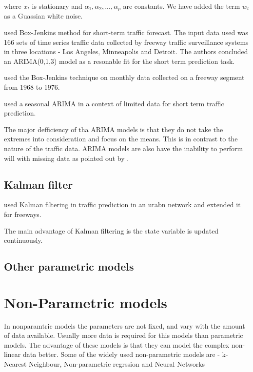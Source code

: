 where $x_{t}$ is stationary and $ \alpha_{1}, \alpha_{2},..., \alpha_{p} $ are constants. We have
added the term $w_{t}$ as a Guassian white noise.


\citet{ahmed1979analysis} used Box-Jenkins method for short-term traffic forecast. The input data
used was 166 sets of time series traffic data collected by freeway traffic surveillance systems in
three locations - Los Angeles, Minneapolis and Detroit. The authors concluded an ARIMA(0,1,3) model
as a resonable fit for the short term prediction task.

\citet{nihan1980use} used the Box-Jenkins technique on monthly data collected on a freeway segment
from 1968 to 1976.

\citet{kumar2015short} used a seasonal ARIMA in a context of limited data for short term traffic 
prediction.

The major defficiency of tha ARIMA models is that they do not take the extremes into
consideration and focus on the means. This is in contrast to the nature of the traffic data.
ARIMA models are also have the inability to perform will with missing data as pointed out by
\citet{smith1997traffic}.

\subsection{Kalman filter}
\citet{okutani1984dynamic} used Kalman filtering in traffic prediction in an urabn network and
extended it for freeways.

The main advantage of Kalman filtering is the state variable is updated continuously.

\subsection{Other parametric models}

\section{Non-Parametric models}
In nonparamtric models the parameters are not fixed, and vary with the amount of data available.
Usually more data is required for this models than parametric models. The advantage of these models
is that they can model the complex non-linear data better. Some of the widely used non-parametric
models are - k-Nearest Neighbour, Non-parametric regrssion and Neural Networks

